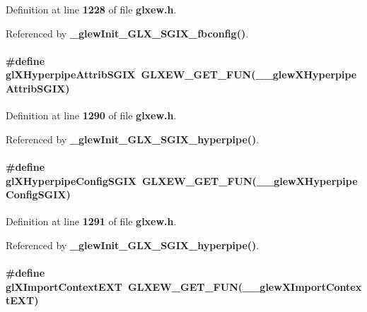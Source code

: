 Definition at line {\bf 1228} of file {\bf glxew.\+h}.



Referenced by {\bf \+\_\+glew\+Init\+\_\+\+G\+L\+X\+\_\+\+S\+G\+I\+X\+\_\+fbconfig()}.

\paragraph[{gl\+X\+Hyperpipe\+Attrib\+S\+G\+IX}]{\setlength{\rightskip}{0pt plus 5cm}\#define gl\+X\+Hyperpipe\+Attrib\+S\+G\+IX~{\bf G\+L\+X\+E\+W\+\_\+\+G\+E\+T\+\_\+\+F\+UN}({\bf \+\_\+\+\_\+glew\+X\+Hyperpipe\+Attrib\+S\+G\+IX})}\label{glxew_8h_a5198563c3b8ffc4f3819785c27600d33}


Definition at line {\bf 1290} of file {\bf glxew.\+h}.



Referenced by {\bf \+\_\+glew\+Init\+\_\+\+G\+L\+X\+\_\+\+S\+G\+I\+X\+\_\+hyperpipe()}.

\paragraph[{gl\+X\+Hyperpipe\+Config\+S\+G\+IX}]{\setlength{\rightskip}{0pt plus 5cm}\#define gl\+X\+Hyperpipe\+Config\+S\+G\+IX~{\bf G\+L\+X\+E\+W\+\_\+\+G\+E\+T\+\_\+\+F\+UN}({\bf \+\_\+\+\_\+glew\+X\+Hyperpipe\+Config\+S\+G\+IX})}\label{glxew_8h_af6aab4582cf9cbe81fd58aa6876efb7f}


Definition at line {\bf 1291} of file {\bf glxew.\+h}.



Referenced by {\bf \+\_\+glew\+Init\+\_\+\+G\+L\+X\+\_\+\+S\+G\+I\+X\+\_\+hyperpipe()}.

\paragraph[{gl\+X\+Import\+Context\+E\+XT}]{\setlength{\rightskip}{0pt plus 5cm}\#define gl\+X\+Import\+Context\+E\+XT~{\bf G\+L\+X\+E\+W\+\_\+\+G\+E\+T\+\_\+\+F\+UN}({\bf \+\_\+\+\_\+glew\+X\+Import\+Context\+E\+XT})}\label{glxew_8h_a7e2f5b1e503606502b4f4b13886d4666}


